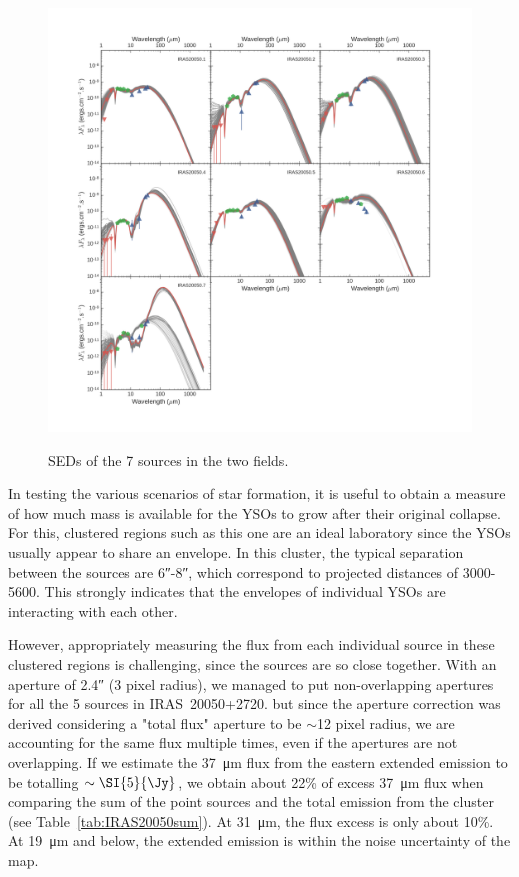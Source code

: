 \begin{figure}
\begin{center}
\hspace*{-1in}
\includegraphics[width=1.4\textwidth]{Figures/IRAS20050_SEDs.png}
\label{fig:IRAS20050_SEDs}

\caption[IRAS20050+2720 SEDs]{SEDs of the 7 sources in the two fields. }
\end{center}
\end{figure}


In testing the various scenarios of star formation, it is useful to obtain a measure of how much mass is available for the YSOs to grow after their original collapse. For this, clustered regions such as this one are an ideal laboratory since the YSOs usually appear to share an envelope. In this cluster, the typical separation between the sources are \ang{;;6}-\ang{;;8}, which correspond to projected distances of \num{3000}-\SI{5600}{\au}. This strongly indicates that the envelopes of individual YSOs are interacting with each other.


However, appropriately measuring the flux from each individual source in these clustered regions is challenging, since the sources are so close together. With an aperture of \ang{;;2.4} (3 pixel radius), we managed to put non-overlapping apertures for all the 5 sources in IRAS~20050+2720. but since the aperture correction was derived considering a "total flux" aperture to be $\sim$12 pixel radius, we are accounting for the same flux multiple times, even if the apertures are not overlapping. If we estimate the \SI{37}{\um} flux from the eastern extended emission to be totalling $\sim\SI{5}{\Jy}$, we obtain about 22\% of excess \SI{37}{\um} flux when comparing the sum of the point sources and the total emission from the cluster (see Table~\ref{tab:IRAS20050sum}). At \SI{31}{\um}, the flux excess is only about 10\%. At \SI{19}{\um} and below, the extended emission is within the noise uncertainty of the map. 

